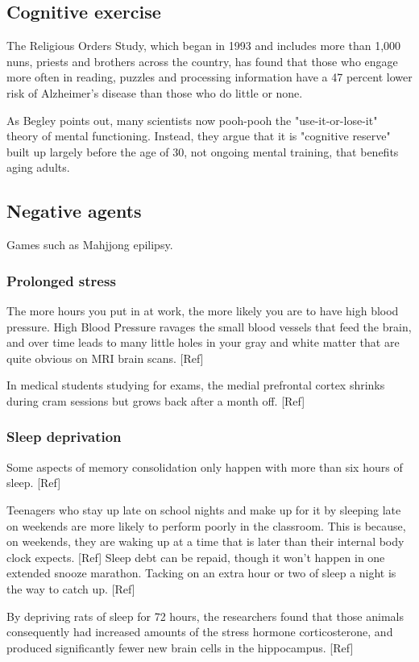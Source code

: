 \documentclass[oneside, article]{memoir}
\begin{document}
\subsection{Cognitive exercise}
The Religious Orders Study, which began in 1993 and includes more than 1,000 nuns, priests and brothers across the country, has found that those who engage more often in reading, puzzles and processing information have a 47 percent lower risk of Alzheimer's disease than those who do little or none.

As Begley points out, many scientists now pooh-pooh the "use-it-or-lose-it" theory of mental functioning. Instead, they argue that it is "cognitive reserve" built up largely before the age of 30, not ongoing mental training, that benefits aging adults.

\subsection{Negative agents}
Games such as Mahjjong epilipsy.

\subsubsection{Prolonged stress}
The more hours you put in at work, the more likely you are to have high blood pressure. High Blood Pressure ravages the small blood vessels that feed the brain, and over time leads to many little holes in your gray and white matter that are quite obvious on MRI brain scans. [Ref]

In medical students studying for exams, the medial prefrontal cortex shrinks during cram sessions but grows back after a month off. [Ref]

\subsubsection{Sleep deprivation}
Some aspects of memory consolidation only happen with more than six hours of sleep. [Ref]

Teenagers who stay up late on school nights and make up for it by sleeping late on weekends are more likely to perform poorly in the classroom. This is because, on weekends, they are waking up at a time that is later than their internal body clock expects. [Ref] Sleep debt can be repaid, though it won't happen in one extended snooze marathon. Tacking on an extra hour or two of sleep a night is the way to catch up. [Ref]

By depriving rats of sleep for 72 hours, the researchers found that those animals consequently had increased amounts of the stress hormone corticosterone, and produced significantly fewer new brain cells in the hippocampus. [Ref]
\end{document}
